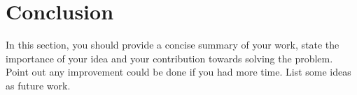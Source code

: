 \section{Conclusion}
In this section, you should provide a concise summary of your work, state the importance of your idea and your contribution towards solving the problem. Point out any improvement could be done  if you had more time. List some ideas as future work. 
